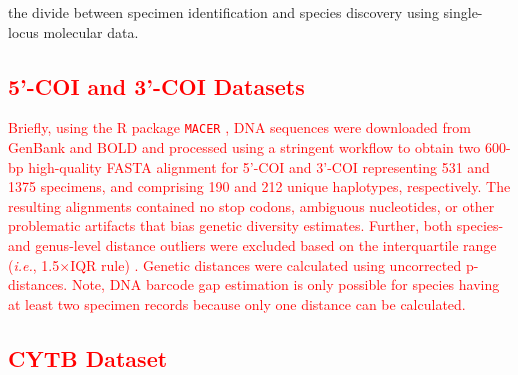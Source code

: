 \documentclass[12pt]{article}
\begin{document}
the divide between specimen identification and species discovery using single-locus molecular data.

\subsection{\textcolor{red}{5'-COI and 3'-COI Datasets}}

\textcolor{red}{Briefly, using the R package {\tt MACER} \citep{young2021macer}, DNA sequences were downloaded from GenBank and BOLD and processed using a stringent workflow to obtain two 600-bp high-quality FASTA alignment for 5'-COI and 3'-COI representing 531 and 1375 specimens, and comprising 190 and 212 unique haplotypes, respectively. The resulting alignments contained no stop codons, ambiguous nucleotides, or other problematic artifacts that bias genetic diversity estimates. Further, both species- and genus-level distance outliers were excluded based on the interquartile range (\textit{i.e.}, 1.5$\times$IQR rule) \citep{young2021macer}. Genetic distances were calculated using uncorrected p-distances. Note, DNA barcode gap estimation is only possible for species having at least two specimen records because only one distance can be calculated.}

\subsection{\textcolor{red}{CYTB Dataset}}
\end{document}
